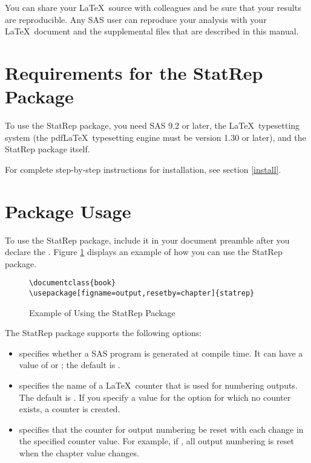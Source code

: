 \documentclass[article,oneside]{memoir}
\newcommand*{\StatRep}{\textsf{StatRep}\xspace}
\begin{document}
You can share your \LaTeX\ source with colleagues and be sure that your results
are reproducible. Any SAS user can reproduce your analysis with your \LaTeX\ document
and the supplemental files that are described in this manual.

\section{Requirements for the \StatRep Package}
To use the \StatRep package, you need SAS 9.2 or later,
the \LaTeX\ typesetting system
(the  pdf\LaTeX\ typesetting engine must be version 1.30 or later), and the \StatRep package itself.

For complete step-by-step instructions for installation, see section \ref{install}.
\section{Package Usage}
  To use the \StatRep package, include it in your document preamble after you
  declare the .
  Figure \ref{fig:usage} displays an example of how you can use the \StatRep package.

\begin{figure}[H]
\begin{shaded}
\begin{verbatim}
\documentclass{book}
\usepackage[figname=output,resetby=chapter]{statrep}
\end{verbatim}%
\end{shaded}
\caption{Example of Using the \StatRep Package}\label{fig:usage}
\end{figure}

 The \StatRep package supports the following options:
     \begin{itemize}
     \item {} specifies whether a SAS program
     is generated at compile time. 
     It can have a value of  or ; the default is .

     \item {} specifies the name of a \LaTeX\ counter
     that is used for numbering outputs.
     The default is . If you specify a value for the 
     option for which no counter exists,
     a counter is created.

     \item {} specifies that the counter for output numbering be reset with
     each change in the specified counter value. For example, if ,
     all output numbering is reset when the chapter value changes.
     \end{itemize}
\end{document}
